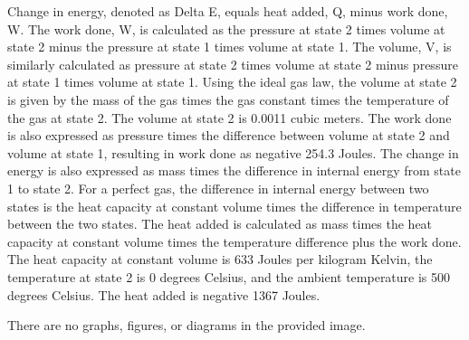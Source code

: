 Change in energy, denoted as Delta E, equals heat added, Q, minus work done, W. The work done, W, is calculated as the pressure at state 2 times volume at state 2 minus the pressure at state 1 times volume at state 1. The volume, V, is similarly calculated as pressure at state 2 times volume at state 2 minus pressure at state 1 times volume at state 1. Using the ideal gas law, the volume at state 2 is given by the mass of the gas times the gas constant times the temperature of the gas at state 2. The volume at state 2 is 0.0011 cubic meters. The work done is also expressed as pressure times the difference between volume at state 2 and volume at state 1, resulting in work done as negative 254.3 Joules. The change in energy is also expressed as mass times the difference in internal energy from state 1 to state 2. For a perfect gas, the difference in internal energy between two states is the heat capacity at constant volume times the difference in temperature between the two states. The heat added is calculated as mass times the heat capacity at constant volume times the temperature difference plus the work done. The heat capacity at constant volume is 633 Joules per kilogram Kelvin, the temperature at state 2 is 0 degrees Celsius, and the ambient temperature is 500 degrees Celsius. The heat added is negative 1367 Joules.

There are no graphs, figures, or diagrams in the provided image.